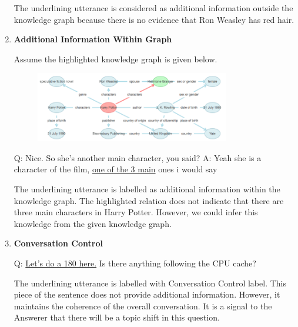 \documentclass[bsc,frontabs,twoside,singlespacing,parskip,deptreport]{infthesis}     %
\begin{document}
\begin{enumerate}
The underlining utterance is considered as additional information outside the knowledge graph because there is no evidence that Ron Weasley has red hair.


\item \textbf{Additional Information Within Graph}

Assume the highlighted knowledge graph is given below.

\begin{figure}[h]
    \centering
    \includegraphics[width=0.8\textwidth]{aiwg.png}
\end{figure}

\begin{exe}
	\ex
		\begin{xlist}
			\ex \label{aiwgq1} Q: Nice. So she's another main character, you said?
			\ex \label{aiwga1} A: Yeah she is a character of the film, \underline{one of the 3 main} ones i would say
\end{xlist}
\end{exe}

The underlining utterance is labelled as additional information within the knowledge graph. The highlighted relation does not indicate that there are three main characters in Harry Potter. However, we could infer this knowledge from the given knowledge graph.



\item \textbf{Conversation Control}

\begin{exe}
	\ex
		\begin{xlist}
			\ex \label{ccq1} Q: \underline{Let's do a 180 here.} Is there anything following the CPU cache?
\end{xlist}
\end{exe}

The underlining utterance is labelled with Conversation Control label. This piece of the sentence does not provide additional information. However, it maintains the coherence of the overall conversation. It is a signal to the Answerer that there will be a topic shift in this question.



\end{enumerate}
\end{document}
